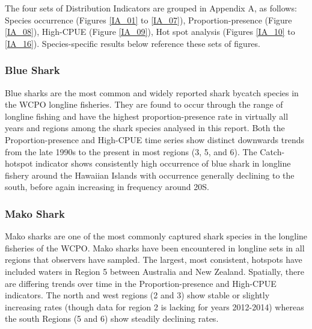 \documentclass[12pt]{SCreport}
\begin{document}
      The four sets of Distribution Indicators are grouped in Appendix A, as follows: Species occurrence (Figures \ref{IA_01} to \ref{IA_07}), Proportion-presence (Figure \ref{IA_08}), High-CPUE (Figure \ref{IA_09}), Hot spot analysis (Figures \ref{IA_10} to \ref{IA_16}).  Species-specific results below reference these sets of figures.
      
        \subsubsection{Blue Shark}
Blue sharks are the most common and widely reported shark bycatch species in the WCPO longline fisheries.  They are found to occur through the range of longline fishing and have the highest proportion-presence rate in virtually all years and regions among the shark species analysed in this report.  Both the Proportion-presence and High-CPUE time series show distinct downwards trends from the late 1990s to the present in most regions (3, 5, and 6).  The Catch-hotspot indicator shows consistently high occurrence of blue shark in longline fishery around the Hawaiian Islands with occurrence generally declining to the south, before again increasing in frequency around 20\degree{}S.





\subsubsection{Mako Shark}
Mako sharks are one of the most commonly captured shark species in the longline fisheries of the WCPO.  Mako sharks have been encountered in longline sets in all regions that observers have sampled.  The largest, most consistent, hotspots have included waters in Region 5 between Australia and New Zealand.  Spatially, there are differing trends over time in the Proportion-presence and High-CPUE indicators.  The north and west regions (2 and 3) show stable or slightly increasing rates (though data for region 2 is lacking for years 2012-2014) whereas the south Regions (5 and 6) show steadily declining rates.
\end{document}

